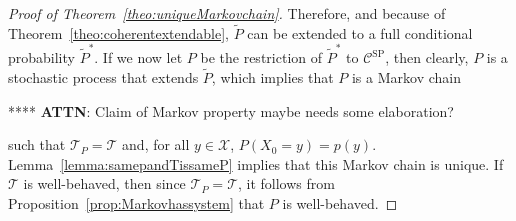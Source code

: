 \documentclass[10pt]{paper}
\theoremstyle{definition}
\newcommand{\states}{\mathcal{X}}
\begin{document}
\begin{proof}[Proof of Theorem~\ref{theo:uniqueMarkovchain}]
Therefore, and because of Theorem~\ref{theo:coherentextendable}, $\tilde{P}$ can be extended to a full conditional probability $\tilde{P}^*$. If we now let $P$ be the restriction of $\tilde{P}^*$ to $\mathcal{C}^\mathrm{SP}$, then clearly, $P$ is a stochastic process that extends $\tilde{P}$, which implies that $P$ is a Markov chain 

**** {\bf ATTN}: Claim of Markov property maybe needs some elaboration?

such that $\mathcal{T}_P=\mathcal{T}$ and, for all $y\in\states$, $P(X_0=y)=p(y)$. Lemma~\ref{lemma:samepandTissameP} implies that this Markov chain is unique. If $\mathcal{T}$ is well-behaved, then since $\mathcal{T}_P=\mathcal{T}$, it follows from Proposition~\ref{prop:Markovhassystem} that $P$ is well-behaved.
\end{proof}
\end{document}

